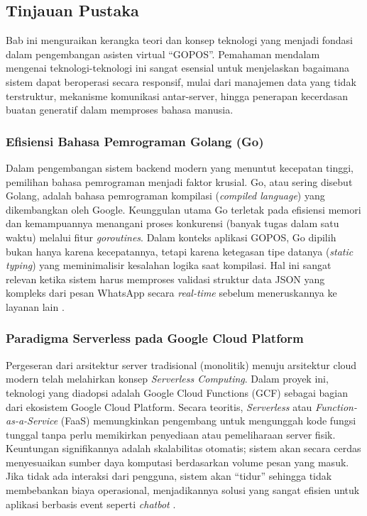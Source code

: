 
\subsection{Tinjauan Pustaka}

Bab ini menguraikan kerangka teori dan konsep teknologi yang menjadi fondasi dalam pengembangan asisten virtual ``GOPOS''. Pemahaman mendalam mengenai teknologi-teknologi ini sangat esensial untuk menjelaskan bagaimana sistem dapat beroperasi secara responsif, mulai dari manajemen data yang tidak terstruktur, mekanisme komunikasi antar-server, hingga penerapan kecerdasan buatan generatif dalam memproses bahasa manusia.

\subsubsection{Efisiensi Bahasa Pemrograman Golang (Go)}

Dalam pengembangan sistem backend modern yang menuntut kecepatan tinggi, pemilihan bahasa pemrograman menjadi faktor krusial. Go, atau sering disebut Golang, adalah bahasa pemrograman kompilasi (\textit{compiled language}) yang dikembangkan oleh Google. Keunggulan utama Go terletak pada efisiensi memori dan kemampuannya menangani proses konkurensi (banyak tugas dalam satu waktu) melalui fitur \textit{goroutines}. Dalam konteks aplikasi GOPOS, Go dipilih bukan hanya karena kecepatannya, tetapi karena ketegasan tipe datanya (\textit{static typing}) yang meminimalisir kesalahan logika saat kompilasi. Hal ini sangat relevan ketika sistem harus memproses validasi struktur data JSON yang kompleks dari pesan WhatsApp secara \textit{real-time} sebelum meneruskannya ke layanan lain \parencite{dimara2024}.

\subsubsection{Paradigma Serverless pada Google Cloud Platform}

Pergeseran dari arsitektur server tradisional (monolitik) menuju arsitektur cloud modern telah melahirkan konsep \textit{Serverless Computing}. Dalam proyek ini, teknologi yang diadopsi adalah Google Cloud Functions (GCF) sebagai bagian dari ekosistem Google Cloud Platform. Secara teoritis, \textit{Serverless} atau \textit{Function-as-a-Service} (FaaS) memungkinkan pengembang untuk mengunggah kode fungsi tunggal tanpa perlu memikirkan penyediaan atau pemeliharaan server fisik. Keuntungan signifikannya adalah skalabilitas otomatis; sistem akan secara cerdas menyesuaikan sumber daya komputasi berdasarkan volume pesan yang masuk. Jika tidak ada interaksi dari pengguna, sistem akan ``tidur'' sehingga tidak membebankan biaya operasional, menjadikannya solusi yang sangat efisien untuk aplikasi berbasis event seperti \textit{chatbot} \parencite{gcpjournal2015}.

